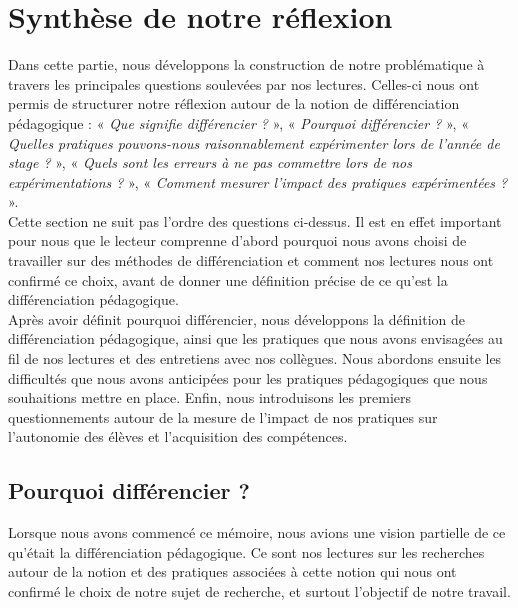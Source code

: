 \section{Synthèse de notre réflexion}
Dans cette partie, nous développons la construction de notre problématique à travers les principales questions soulevées par nos lectures. Celles-ci nous ont permis de structurer notre réflexion autour de la notion de différenciation pédagogique :
« \textit{Que signifie différencier ?} », « \textit{Pourquoi différencier ?} », « \textit{Quelles pratiques pouvons-nous raisonnablement expérimenter lors de l'année de stage ?} », « \textit{Quels sont les erreurs à ne pas commettre lors de nos expérimentations ?} », « \textit{Comment mesurer l'impact des pratiques expérimentées ?} ».\\
Cette section ne suit pas l'ordre des questions ci-dessus. Il est en effet important pour nous que le lecteur comprenne d'abord pourquoi nous avons choisi de travailler sur des méthodes de différenciation et comment nos lectures nous ont confirmé ce choix, avant de donner une définition précise de ce qu'est la différenciation pédagogique.\\
Après avoir définit pourquoi différencier, nous développons la définition de différenciation pédagogique, ainsi que les pratiques que nous avons envisagées au fil de nos lectures et des entretiens avec nos collègues. Nous abordons ensuite les difficultés que nous avons anticipées pour les pratiques pédagogiques que nous souhaitions mettre en place. Enfin, nous introduisons les premiers questionnements autour de la mesure de l'impact de nos pratiques sur l'autonomie des élèves et l'acquisition des compétences.\\

\subsection{Pourquoi différencier ?}




Lorsque nous avons commencé ce mémoire, nous avions une vision partielle de ce qu'était la différenciation pédagogique. Ce sont nos lectures sur les recherches autour de la notion et des pratiques associées à cette notion qui nous ont confirmé le choix de notre sujet de recherche, et surtout l'objectif de notre travail.
